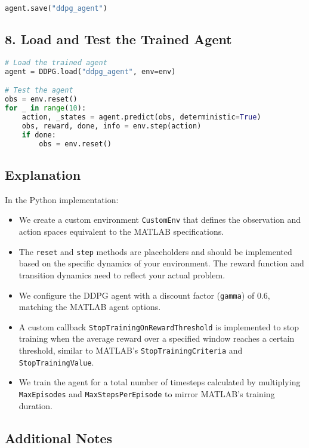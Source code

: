 \documentclass[12pt]{article}
\begin{document}
\begin{lstlisting}[language=Python, breaklines=true]
agent.save("ddpg_agent")
\end{lstlisting}

\subsection*{8. Load and Test the Trained Agent}

\begin{lstlisting}[language=Python, breaklines=true]
# Load the trained agent
agent = DDPG.load("ddpg_agent", env=env)

# Test the agent
obs = env.reset()
for _ in range(10):
    action, _states = agent.predict(obs, deterministic=True)
    obs, reward, done, info = env.step(action)
    if done:
        obs = env.reset()
\end{lstlisting}

\subsection*{Explanation}

In the Python implementation:

\begin{itemize}
    \item We create a custom environment \texttt{CustomEnv} that defines the observation and action spaces equivalent to the MATLAB specifications.
    \item The \texttt{reset} and \texttt{step} methods are placeholders and should be implemented based on the specific dynamics of your environment. The reward function and transition dynamics need to reflect your actual problem.
    \item We configure the DDPG agent with a discount factor (\texttt{gamma}) of 0.6, matching the MATLAB agent options.
    \item A custom callback \texttt{StopTrainingOnRewardThreshold} is implemented to stop training when the average reward over a specified window reaches a certain threshold, similar to MATLAB's \texttt{StopTrainingCriteria} and \texttt{StopTrainingValue}.
    \item We train the agent for a total number of timesteps calculated by multiplying \texttt{MaxEpisodes} and \texttt{MaxStepsPerEpisode} to mirror MATLAB's training duration.
\end{itemize}

\subsection*{Additional Notes}
\end{document}
